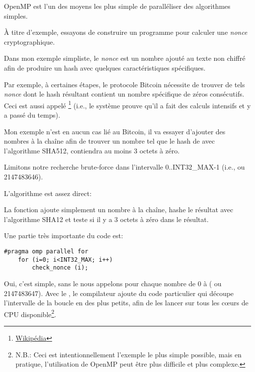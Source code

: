\label{openmp}

OpenMP est l'un des moyens les plus simple de paralléliser des algorithmes simples.


À titre d'exemple, essayons de construire un programme pour calculer une \emph{nonce}
cryptographique.

Dans mon exemple simpliste, le \emph{nonce} est un nombre ajouté au texte non chiffré
afin de produire un hash avec quelques caractéristiques spécifiques.

Par exemple, à certaines étapes, le protocole Bitcoin nécessite de trouver de tels
\emph{nonce} dont le hash résultant contient un nombre spécifique de zéros consécutifs.
Ceci est aussi appelé 
\footnote{\href{https://en.wikipedia.org/wiki/Proof-of-work_system}{Wikipédia}}
(i.e., le système prouve qu'il a fait des calculs intensifs et y a passé du temps).

Mon exemple n'est en aucun cas lié au Bitcoin, il va essayer d'ajouter des nombres
à la chaîne afin de trouver un nombre tel que le hash de 
avec l'algorithme SHA512, contiendra au moins 3 octets à zéro.

Limitons notre recherche brute-force dans l'intervalle 0..INT32\_MAX-1 (i.e., 
ou 2147483646).

L'algorithme est assez direct:



La fonction  ajoute simplement un nombre à la chaîne, hashe le
résultat avec l'algorithme SHA12 et teste si il y a 3 octets à zéro dans le résultat.

Une partie très importante du code est:

\begin{lstlisting}[style=customc]
	#pragma omp parallel for
	for (i=0; i<INT32_MAX; i++)
		check_nonce (i);
\end{lstlisting}

Oui, c'est simple, sans le  nous appelons  pour chaque
nombre de 0 à  ( ou 2147483647).
Avec le , le compilateur ajoute du code particulier qui découpe l'intervalle
de la boucle en des plus petits, afin de les lancer sur tous les c\oe{}urs de \ac{CPU}
disponible\footnote{N.B.: Ceci est intentionnellement l'exemple le plus simple possible,
mais en pratique, l'utilisation de OpenMP peut être plus difficile et plus complexe.}.

